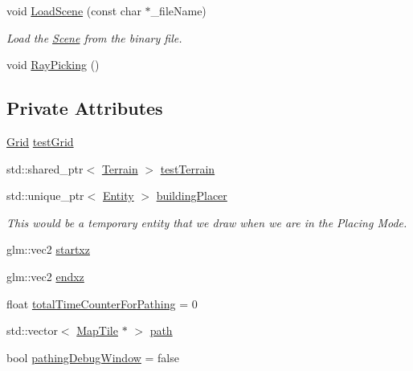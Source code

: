 \begin{DoxyCompactItemize}
void \mbox{\hyperlink{classpiolot_1_1_test_scene_a513072b5c63768aa0fcd0dd5a0a0ca98}{Load\+Scene}} (const char $\ast$\+\_\+file\+Name)
\begin{DoxyCompactList}\small\item\em Load the \mbox{\hyperlink{classpiolot_1_1_scene}{Scene}} from the binary file. \end{DoxyCompactList}\item 
void \mbox{\hyperlink{classpiolot_1_1_test_scene_a22c630a5e1c5725f04140ec15a125de7}{Ray\+Picking}} ()
\end{DoxyCompactItemize}
\subsection*{Private Attributes}
\begin{DoxyCompactItemize}
\item 
\mbox{\hyperlink{classpiolot_1_1_grid}{Grid}} \mbox{\hyperlink{classpiolot_1_1_test_scene_aca94d51dc521dd620b45d85ee817cb0a}{test\+Grid}}
\item 
std\+::shared\+\_\+ptr$<$ \mbox{\hyperlink{classpiolot_1_1_terrain}{Terrain}} $>$ \mbox{\hyperlink{classpiolot_1_1_test_scene_a349626f35bec9409fa359108ce08c32e}{test\+Terrain}}
\item 
std\+::unique\+\_\+ptr$<$ \mbox{\hyperlink{classpiolot_1_1_entity}{Entity}} $>$ \mbox{\hyperlink{classpiolot_1_1_test_scene_ae0a460b8b6b3d352f92be069a6d69fb3}{building\+Placer}}
\begin{DoxyCompactList}\small\item\em This would be a temporary entity that we draw when we are in the Placing Mode. \end{DoxyCompactList}\item 
glm\+::vec2 \mbox{\hyperlink{classpiolot_1_1_test_scene_ab19142067d70aede9c5ac3cadecb1c29}{startxz}}
\item 
glm\+::vec2 \mbox{\hyperlink{classpiolot_1_1_test_scene_aa7838a55b521b6d9c1d32dc3ca240ba7}{endxz}}
\item 
float \mbox{\hyperlink{classpiolot_1_1_test_scene_ad676a1a351b61b8e7071b2d91856ad14}{total\+Time\+Counter\+For\+Pathing}} = 0
\item 
std\+::vector$<$ \mbox{\hyperlink{classpiolot_1_1_map_tile}{Map\+Tile}} $\ast$ $>$ \mbox{\hyperlink{classpiolot_1_1_test_scene_a2a69831062ede8e0e0f889064b257d51}{path}}
\item 
bool \mbox{\hyperlink{classpiolot_1_1_test_scene_ac12dc2505449af346ebcead571fd2954}{pathing\+Debug\+Window}} = false

\end{DoxyCompactItemize}
